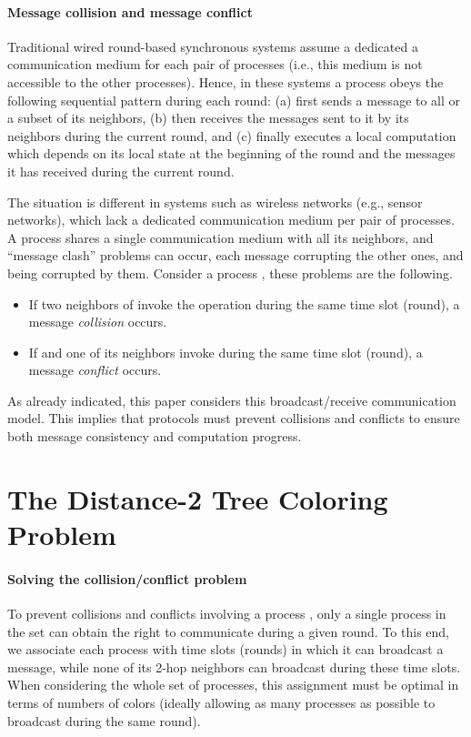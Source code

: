 \documentclass[11pt,english]{article}
\begin{document}
\paragraph{Message collision and message conflict}
Traditional wired round-based synchronous systems assume a dedicated a
communication medium for each pair of processes (i.e., this medium is
not accessible to the other processes).  Hence, in these systems a
process  obeys the following sequential pattern during each
round: (a) first  sends a message to all or a subset of its
neighbors, (b) then  receives the messages sent to it by its
neighbors during the current round, and (c) finally executes a local
computation which depends on its local state at the beginning of the
round and the messages it has received during the current round.

The situation is different in systems such as wireless networks (e.g.,
sensor networks), which lack a dedicated communication medium per pair
of processes.  A process  shares a single communication medium
with all its neighbors, and ``message clash'' problems can occur,
each message corrupting the other ones, and being corrupted by
them. Consider a process , these problems are the following.
\begin{itemize}
\vspace{-0.1cm}
\item 
If two  neighbors of  invoke the operation   
during the same time slot (round), a message {\it collision} occurs.  
\vspace{-0.2cm}
\item 
If  and one  of its neighbors 
invoke   during the same time slot 
(round), a message {\it conflict} occurs.  
\end{itemize}
As already indicated, this paper considers this broadcast/receive
communication model. This implies that protocols must prevent
collisions and conflicts to ensure both message consistency and
computation progress.




\section{The Distance-2 Tree Coloring Problem}
\label{sec:D2-coloring}

\paragraph{Solving the collision/conflict problem}
To prevent collisions and conflicts involving a process , only a
single process in the set  can obtain the
right to communicate during a given round. To this end, we associate
each process with time slots (rounds) in which it can broadcast a
message, while none of its 2-hop neighbors can broadcast during these
time slots. When considering the whole set of processes, this
assignment must be optimal in terms of numbers of colors (ideally
allowing as many processes as possible to broadcast during the same
round).
\end{document}
